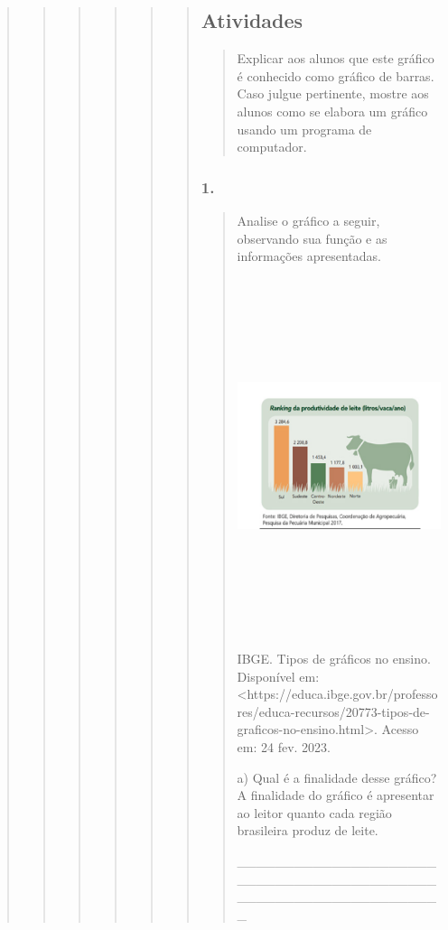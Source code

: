 \begin{quote}
\begin{quote}
\begin{quote}
\begin{quote}
\begin{quote}
\begin{quote}
\subsection{Atividades}\label{atividades-8}

\begin{quote}
Explicar aos alunos que este gráfico é conhecido como gráfico de barras.
Caso julgue pertinente, mostre aos alunos como se elabora um gráfico
usando um programa de computador.
\end{quote}

\subsubsection{1. }\label{section-66}

\begin{quote}
Analise o gráfico a seguir, observando sua função e as informações
apresentadas.

\includegraphics[width=5.68530in,height=4.10069in]{media/image29.png}

IBGE. Tipos de gráficos no ensino. Disponível em:
\textless{}https://educa.ibge.gov.br/professores/educa-recursos/20773-tipos-de-graficos-no-ensino.html\textgreater{}.
Acesso em: 24 fev. 2023.

a) Qual é a finalidade desse gráfico? A finalidade do gráfico é
apresentar ao leitor quanto cada região brasileira produz de leite.

\_\_\_\_\_\_\_\_\_\_\_\_\_\_\_\_\_\_\_\_\_\_\_\_\_\_\_\_\_\_\_\_\_\_\_\_\_\_\_\_\_\_\_\_\_\_\_\_\_\_\_\_\_\_\_\_\_\_\_\_\_\_\_\_


\end{quote}
\end{quote}
\end{quote}
\end{quote}
\end{quote}
\end{quote}
\end{quote}
